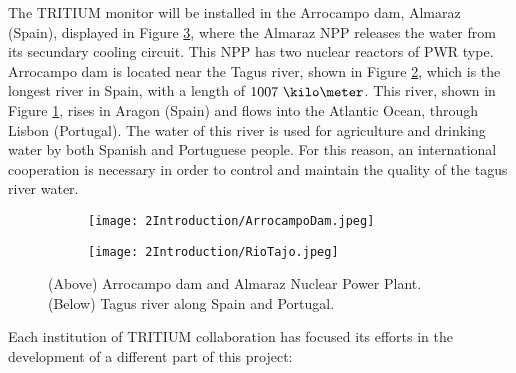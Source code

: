 
The TRITIUM monitor will be installed in the Arrocampo dam, Almaraz (Spain), displayed in Figure \ref{fig:Arrocampo}, where the Almaraz NPP releases the water from its secundary cooling circuit. This NPP has two nuclear reactors of PWR type. Arrocampo dam is located near the Tagus river, shown in Figure \ref{subfig:TajusRiver}, which is the longest river in Spain, with a length of $1007~\kilo\meter$. This river, shown in Figure \ref{subfig:Arrocampo_Dam}, rises in Aragon (Spain) and flows into the Atlantic Ocean, through Lisbon (Portugal). The water of this river is used for agriculture and drinking water by both Spanish and Portuguese people. For this reason, an international cooperation is necessary in order to control and maintain the quality of the tagus river water.

\begin{figure}
\centering
    \begin{subfigure}[b]{0.45\textwidth}
    \centering
    \texttt{[image: 2Introduction/ArrocampoDam.jpeg]}  
    \caption{\label{subfig:Arrocampo_Dam}}
    \end{subfigure}
    \hfill
    \begin{subfigure}[b]{0.45\textwidth}
    \centering
    \texttt{[image: 2Introduction/RioTajo.jpeg]}  
    \caption{\label{subfig:TajusRiver}}
    \end{subfigure}
 \caption{(Above) Arrocampo dam and Almaraz Nuclear Power Plant. (Below) Tagus river along Spain and Portugal.}
 \label{fig:Arrocampo}
\end{figure}

Each institution of TRITIUM collaboration has focused its efforts in the development of a different part of this project:

